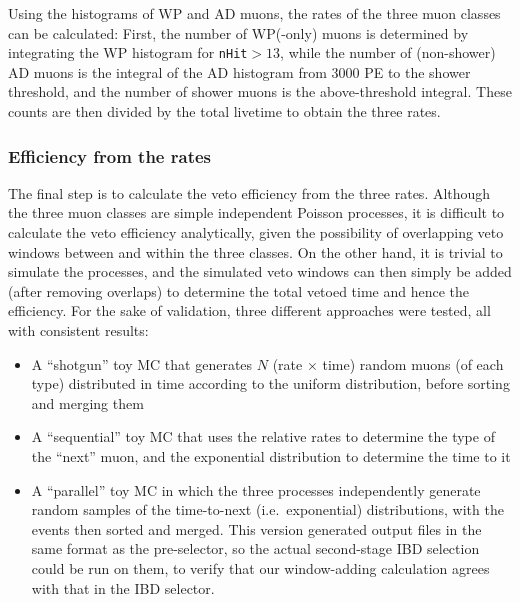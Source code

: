 \documentclass[../thesis.tex]{subfiles}
\begin{document}
\begin{comment}
  XXX local slides from mid-late Oct for retrigger plots. See misc_ana/MuonVetoEff/condenser4retrig.

Are our efficiencies biased because we don't count for the'' `muon multiplicity efficiency' coming from being falsely ignored as a retrigger?
\end{comment}

Using the histograms of WP and AD muons, the rates of the three muon classes can be calculated: First, the number of WP(-only) muons is determined by integrating the WP histogram for \texttt{nHit}$> 13$, while the number of (non-shower) AD muons is the integral of the AD histogram from 3000 PE to the shower threshold, and the number of shower muons is the above-threshold integral. These counts are then divided by the total livetime to obtain the three rates.

\subsubsection{Efficiency from the rates}
\label{sec:cutVaryMuVetoEffFromRates}

The final step is to calculate the veto efficiency from the three rates. Although the three muon classes are simple independent Poisson processes, it is difficult to calculate the veto efficiency analytically, given the possibility of overlapping veto windows between and within the three classes. On the other hand, it is trivial to simulate the processes, and the simulated veto windows can then simply be added (after removing overlaps) to determine the total vetoed time and hence the efficiency. For the sake of validation, three different approaches were tested, all with consistent results:

\begin{itemize}
\item A ``shotgun'' toy MC that generates $N$ (rate $\times$ time) random muons (of each type) distributed in time according to the uniform distribution, before sorting and merging them
\item A ``sequential'' toy MC that uses the relative rates to determine the type of the ``next'' muon, and the exponential distribution to determine the time to it
\item A ``parallel'' toy MC in which the three processes independently generate random samples of the time-to-next (i.e.\ exponential) distributions, with the events then sorted and merged. This version generated output files in the same format as the pre-selector, so the actual second-stage IBD selection could be run on them, to verify that our window-adding calculation agrees with that in the IBD selector.
\end{itemize}
\end{document}
